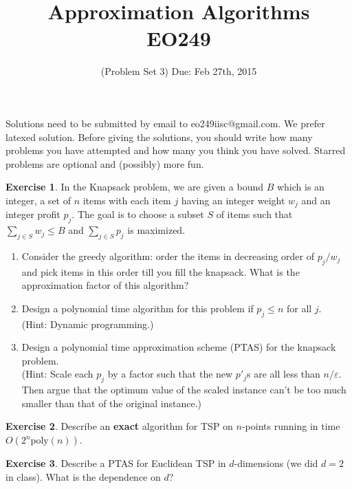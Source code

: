 \documentclass[11pt]{article}
\theoremstyle{definition}
\newtheorem{exercise}{Exercise}
\def\eps{\varepsilon}
\begin{document}
\title{{\bf Approximation Algorithms} \\ 
{\normalsize EO249}}
\date{(Problem Set 3) Due: Feb 27th, 2015}
\maketitle
{\small 
Solutions need to be submitted by email to eo249iisc@gmail.com. We prefer latexed solution. 
Before giving the solutions, you should write how many problems you have attempted and how many you think you have solved.
Starred problems are optional and (possibly) more fun.
}
\vspace{1ex}
\def\poly{\mathrm{poly}}

\begin{exercise}
In the {\sc Knapsack} problem, we are given a bound $B$ which is an integer, a set of $n$ items with each item $j$ having an integer  weight $w_j$ and an integer profit $p_j$.
The goal is to choose a subset $S$ of items such that $\sum_{j\in S} w_j \leq B$ and $\sum_{j\in S} p_j$ is maximized.
\begin{enumerate}
\item Consider the greedy algorithm: order the items in decreasing order of $p_j/w_j$ and pick items in this order till you fill the knapsack. 
         What is the approximation factor of this algorithm?
\item Design a polynomial time algorithm for this problem if  $p_j \leq n$ for all $j$. \\
(Hint: Dynamic programming.)
\item Design a polynomial time approximation scheme (PTAS) for the knapsack problem. \\
(Hint: Scale each $p_j$ by a factor such that the new $p'_j$s are all less than $n/\eps$. Then argue that
the optimum value of the scaled instance can't be too much smaller than that of the original instance.)
\end{enumerate}
\end{exercise}
\vspace{1ex}

\begin{exercise}
Describe an {\bf exact} algorithm for TSP on $n$-points running in time $O(2^n\poly(n))$.
\end{exercise}
\vspace{1ex}


\begin{exercise}
Describe a PTAS for Euclidean TSP in $d$-dimensions (we did $d=2$ in class).
What is the dependence on $d$?
\end{exercise}
\end{document}
